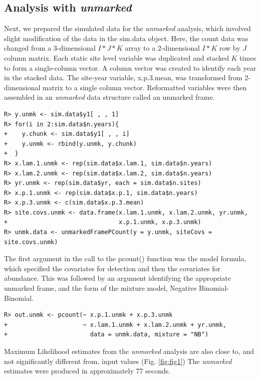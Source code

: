 \documentclass{article}
\begin{document}
\subsection[Analysis with unmarked]{Analysis with \emph{unmarked}}
Next, we prepared the simulated data for the \emph{unmarked} analysis, which involved slight modification of the data in the sim.data object. Here, the count data was changed from a 3-dimensional $I*J*K$ array to a 2-dimensional $I*K$ row by $J$ column matrix.  Each static site level variable was duplicated and stacked $K$ times to form a single-column vector. A column vector was created to identify each year in the stacked data. The site-year variable, x.p.3.mean, was transformed from 2-dimensional matrix to a single column vector. Reformatted variables were then assembled in an \emph{unmarked} data structure called an unmarked frame.

\begin{verbatim}
R> y.unmk <- sim.data$y1[ , , 1]
R> for(i in 2:sim.data$n.years){
+    y.chunk <- sim.data$y1[ , , i]
+    y.unmk <- rbind(y.unmk, y.chunk)
+  } 
R> x.lam.1.unmk <- rep(sim.data$x.lam.1, sim.data$n.years)
R> x.lam.2.unmk <- rep(sim.data$x.lam.2, sim.data$n.years)
R> yr.unmk <- rep(sim.data$yr, each = sim.data$n.sites)
R> x.p.1.unmk <- rep(sim.data$x.p.1, sim.data$n.years)
R> x.p.3.unmk <- c(sim.data$x.p.3.mean)
R> site.covs.unmk <- data.frame(x.lam.1.unmk, x.lam.2.unmk, yr.unmk,
+                               x.p.1.unmk, x.p.3.unmk)
R> unmk.data <- unmarkedFramePCount(y = y.unmk, siteCovs = site.covs.unmk)
\end{verbatim}

The first argument in the call to the pcount() function was the model formula, which specified the covariates for detection and then the covariates for abundance. This was followed by an argument identifying the appropriate unmarked frame, and the form of the mixture model, Negative Binomial-Binomial.

\begin{verbatim}
R> out.unmk <- pcount(~ x.p.1.unmk + x.p.3.unmk
+                     ~ x.lam.1.unmk + x.lam.2.unmk + yr.unmk,
+                       data = unmk.data, mixture = "NB")
\end{verbatim}

Maximum Likelihood estimates from the \emph{unmarked} analysis are also close to, and not significantly different from, input values (Fig. \ref{fig:fig1})  The \emph{unmarked} estimates were produced in approximately 77 seconds.
\end{document}
